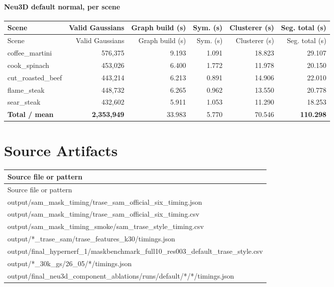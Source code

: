 \documentclass[10pt]{article}
\begin{document}
\paragraph{Neu3D default normal, per scene}
\small
\begin{longtable}{lrrrrr}
\toprule
Scene & Valid Gaussians & Graph build (s) & Sym. (s) & Clusterer (s) & Seg. total (s) \\
\midrule
\endfirsthead
\toprule
Scene & Valid Gaussians & Graph build (s) & Sym. (s) & Clusterer (s) & Seg. total (s) \\
\midrule
\endhead
coffee\_martini & 576,375 & 9.193 & 1.091 & 18.823 & 29.107 \\
cook\_spinach & 453,026 & 6.400 & 1.772 & 11.978 & 20.150 \\
cut\_roasted\_beef & 443,214 & 6.213 & 0.891 & 14.906 & 22.010 \\
flame\_steak & 448,732 & 6.265 & 0.962 & 13.550 & 20.778 \\
sear\_steak & 432,602 & 5.911 & 1.053 & 11.290 & 18.253 \\
\midrule
\textbf{Total / mean} & \textbf{2,353,949} & 33.983 & 5.770 & 70.546 & \textbf{110.298} \\
\bottomrule
\end{longtable}
\normalsize

\section{Source Artifacts}
\small
\begin{longtable}{p{15cm}}
\toprule
Source file or pattern \\
\midrule
\endfirsthead
\toprule
Source file or pattern \\
\midrule
\endhead
output/sam\_mask\_timing/trase\_sam\_official\_six\_timing.json \\
output/sam\_mask\_timing/trase\_sam\_official\_six\_timing.csv \\
output/sam\_mask\_timing\_smoke/sam\_trase\_style\_timing.csv \\
output/*\_trase\_sam/trase\_features\_k30/timings.json \\
output/final\_hypernerf\_1/maskbenchmark\_full10\_res003\_default\_trase\_style.csv \\
output/*\_30k\_gs/26\_05/*/timings.json \\
output/final\_neu3d\_component\_ablations/runs/default/*/*/timings.json \\
\bottomrule
\end{longtable}
\normalsize
\end{document}
